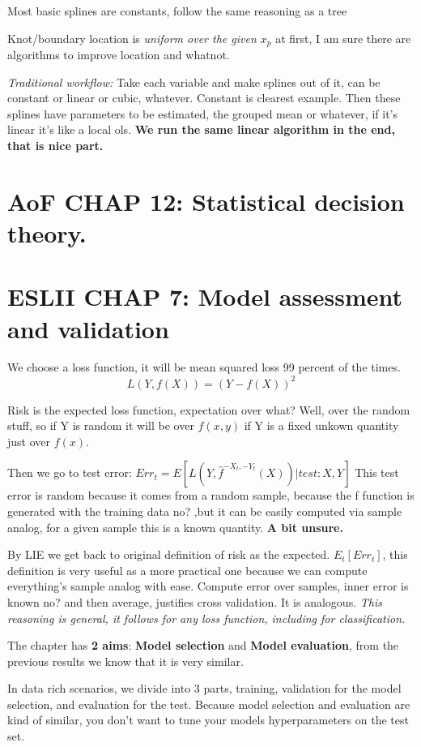 \documentclass{article}
\begin{document}
Most basic splines are constants, follow the same reasoning as a tree 

Knot/boundary location is \textit{uniform over the given $x_p$} at first, I am sure there are algorithms to improve location and whatnot.

\textit{Traditional workflow:}
Take each variable and make splines out of it, can be constant or linear or cubic, whatever. Constant is clearest example.
Then these splines have parameters to be estimated, the grouped mean or whatever, if it's linear it's like a local ols.
\textbf{We run the same linear algorithm in the end, that is nice part.}
\section{AoF CHAP 12: Statistical decision theory.}




\section{ESLII CHAP 7: Model assessment and validation}

We choose a loss function, it will be mean squared loss 99 percent of the times. $$L(Y,f(X))=(Y-f(X))^2$$ 

Risk is the expected loss function, expectation over what? Well, over the random stuff, so if Y is random it will be over $f(x,y)$ if Y is a fixed unkown quantity just over $f(x)$.

Then we go to test error: $Err_t= E[L(Y,\hat{f}^{-X_t,-Y_t}(X))|test: X,Y]$
This test error is random because it comes from a random sample, because the f function is generated with the training data no? ,but it can be easily computed via sample analog, for a given sample this is a known quantity. \textbf{A bit unsure.}

By LIE we get back to original definition of risk as the expected. $E_t[Err_t]$, this definition is very useful as a more practical one because we can compute everything's sample analog with ease. Compute error over samples, inner error is known no? and then average, justifies cross validation. It is analogous.
\textit{This reasoning is general, it follows for any loss function, including for classification.}

The chapter has \textbf{2 aims}: \textbf{Model selection} and \textbf{Model evaluation}, from the previous results we know that it is very similar.

In data rich scenarios, we divide into 3 parts, training, validation for the model selection, and evaluation for the test. Because model selection and evaluation are kind of similar, you don't want to tune your models hyperparameters on the test set.
\end{document}
